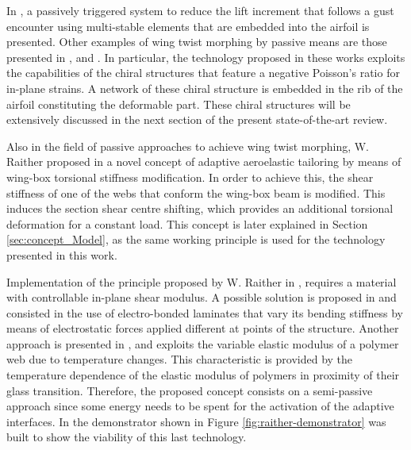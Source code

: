   In \cite{Arrieta2014}, a passively triggered system to reduce the lift increment that follows a gust encounter using multi-stable elements that are embedded into the airfoil is presented. Other examples of wing twist morphing by passive means are those presented in \cite{Bornengo2005}, \cite{Spadoni2007a} and \cite{Spadoni2007b}. In particular, the technology proposed in these works exploits the capabilities of the chiral structures that feature a negative Poisson's ratio for in-plane strains. A network of these chiral structure is embedded in the rib of the airfoil constituting the deformable part. These chiral structures will be extensively discussed in the next section of the present state-of-the-art review.

  Also in the field of passive approaches to achieve wing twist morphing, W. Raither proposed in \cite{Raither2013a} a novel concept of adaptive aeroelastic tailoring by means of wing-box torsional stiffness modification. In order to achieve this, the shear stiffness of one of the webs that conform the wing-box beam is modified. This induces the section shear centre shifting, which provides an additional torsional deformation for a constant load. This concept is later explained in Section \ref{sec:concept_Model}, as the same working principle is used for the technology presented in this work.

  Implementation of the principle proposed by W. Raither in \cite{Raither2013a}, requires a material with controllable in-plane shear modulus. A possible solution is proposed in \cite{Bergamini2006} and consisted in the use of electro-bonded laminates that vary its bending stiffness by means of electrostatic forces applied different at points of the structure. Another approach is presented in \cite{Raither2012}, and exploits the variable elastic modulus of a polymer web due to temperature changes. This characteristic is provided by the temperature dependence of the elastic modulus of polymers in proximity of their glass transition. Therefore, the proposed concept consists on a semi-passive approach since some energy needs to be spent for the activation of the adaptive interfaces. In \cite{Raither2013} the demonstrator shown in Figure \ref{fig:raither-demonstrator} was built to show the viability of this last technology.


